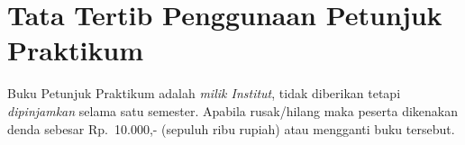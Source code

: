 \documentclass[../main.tex]{subfiles}
\begin{document}
\section*{Tata Tertib Penggunaan Petunjuk Praktikum}
Buku Petunjuk Praktikum adalah \emph{milik Institut}, tidak diberikan tetapi \emph{dipinjamkan} selama satu semester. Apabila rusak\slash{}hilang maka peserta dikenakan denda sebesar Rp.\ 10.000,- (sepuluh ribu rupiah) atau mengganti buku tersebut.
\end{document}
